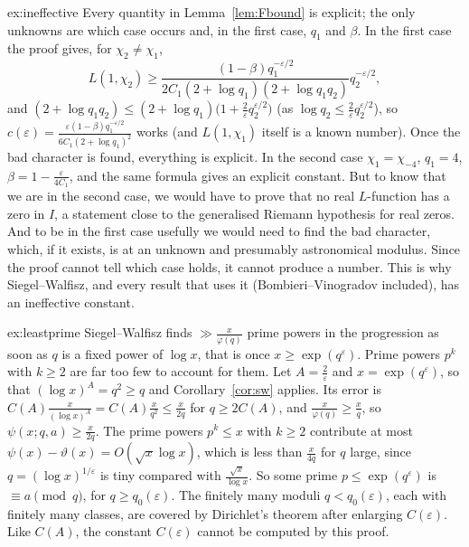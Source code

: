 \begin{solution}{ex:ineffective}
\idea Every quantity in Lemma~\ref{lem:Fbound} is explicit; the only unknowns are which case occurs and, in the first case, $q_1$ and $\beta$.
\writeup In the first case the proof gives, for $\chi_2\ne\chi_1$,
\[
L(1,\chi_2)\ge\frac{(1-\beta)q_1^{-\varepsilon/2}}{2C_1(2+\log q_1)(2+\log q_1q_2)}q_2^{-\varepsilon/2},
\]
and $(2+\log q_1q_2)\le(2+\log q_1)\bigl(1+\frac2\varepsilon q_2^{\varepsilon/2}\bigr)$ (as $\log q_2\le\frac2\varepsilon q_2^{\varepsilon/2}$), so $c(\varepsilon)=\frac{\varepsilon(1-\beta)q_1^{-\varepsilon/2}}{6C_1(2+\log q_1)^2}$ works (and $L(1,\chi_1)$ itself is a known number). Once the bad character is found, everything is explicit. In the second case $\chi_1=\chi_{-4}$, $q_1=4$, $\beta=1-\frac\varepsilon{4C_1}$, and
the same formula gives an explicit constant. But to know that we are in the second case, we would have to prove that no real $L$-function has a zero in $I$, a statement close to the generalised Riemann hypothesis for real zeros. And to be in the first case usefully we would need to find the bad character, which, if it exists, is at an unknown and presumably astronomical modulus. Since the
proof cannot tell which case holds, it cannot produce a number. This is why Siegel--Walfisz, and every result that uses it (Bombieri--Vinogradov included), has an ineffective constant.
\end{solution}

\begin{solution}{ex:leastprime}
\idea Siegel--Walfisz finds $\gg\frac x{\varphi(q)}$ prime powers in the progression as soon as $q$ is a fixed power of $\log x$, that is once $x\ge\exp(q^{\varepsilon})$. Prime powers $p^k$ with $k\ge2$ are far too few to account for them.
\writeup Let $A=\frac2\varepsilon$ and $x=\exp(q^{\varepsilon})$, so that $(\log x)^A=q^2\ge q$ and Corollary~\ref{cor:sw} applies. Its error is $C(A)\frac x{(\log x)^A}=C(A)\frac x{q^2}\le\frac x{2q}$ for $q\ge2C(A)$, and $\frac x{\varphi(q)}\ge\frac xq$, so $\psi(x;q,a)\ge\frac x{2q}$.
The prime powers $p^k\le x$ with $k\ge2$ contribute at most $\psi(x)-\vartheta(x)=O(\sqrt x\log x)$, which is less than $\frac x{4q}$ for $q$ large, since $q=(\log x)^{1/\varepsilon}$ is tiny compared with $\frac{\sqrt x}{\log x}$. So some prime $p\le\exp(q^\varepsilon)$ is $\equiv a\pmod q$, for $q\ge q_0(\varepsilon)$. The finitely many moduli $q<q_0(\varepsilon)$, each with finitely many classes, are covered by Dirichlet's theorem after enlarging $C(\varepsilon)$. Like $C(A)$, the constant $C(\varepsilon)$ cannot be computed by this proof.
\end{solution}


